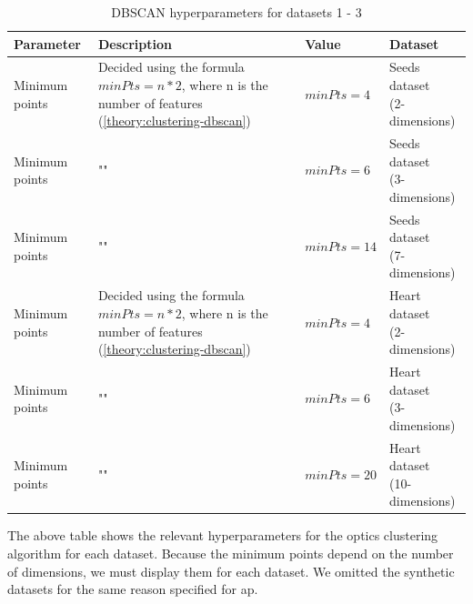 \begin{table}[h]
  \begin{tabular}{|l|p{6cm}|l|l|}
    \hline
    Parameter      & Description                                                                                                    & Value       & Dataset                    \\
    \hline
    Minimum points & Decided using the formula $minPts = n * 2$, where n is the number of features (\ref{theory:clustering-dbscan}) & $minPts=4$  & \makecell[l]{Seeds dataset \\ (2-dimensions)}  \\
    \hline
    Minimum points & ""                                                                                                             & $minPts=6$  & \makecell[l]{Seeds dataset \\ (3-dimensions)} \\
    \hline
    Minimum points & ""                                                                                                             & $minPts=14$ & \makecell[l]{Seeds dataset \\ (7-dimensions)}  \\
    \hline
    Minimum points & Decided using the formula $minPts = n * 2$, where n is the number of features (\ref{theory:clustering-dbscan}) & $minPts=4$  & \makecell[l]{Heart dataset \\ (2-dimensions)}  \\
    \hline
    Minimum points & ""                                                                                                             & $minPts=6$  & \makecell[l]{Heart dataset \\ (3-dimensions)}  \\
    \hline
    Minimum points & ""                                                                                                             & $minPts=20$ & \makecell[l]{Heart dataset \\ (10-dimensions)} \\
    \hline
  \end{tabular}
  \caption{DBSCAN  hyperparameters for datasets 1 - 3}
  \label{tab:dbscan-formula-sklearn}
\end{table}
The above table shows the relevant hyperparameters for the \gls{optics} clustering algorithm for each dataset.
Because the minimum points depend on the number of dimensions, we must display them for each dataset.
We omitted the synthetic datasets for the same reason specified for \gls{ap}.

